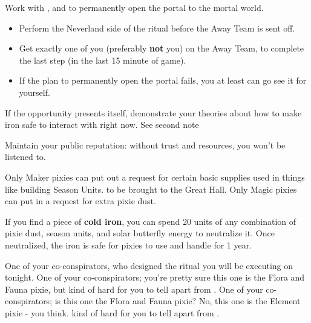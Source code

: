 \documentclass[char]{PP}
\begin{document}
\begin{itemz}
	\item Work with \cSLibrarian{}, \cFHeart{} and \cESweet{} to permanently open the portal to the mortal world.
	\begin{itemize}
		\item Perform the Neverland side of the ritual before the Away Team is sent off.
		\item Get exactly one of you (preferably \textbf{not} you) on the Away Team, to complete the last step (in the last 15 minute of game).
		\item If the plan to permanently open the portal fails, you at least can go see it for yourself.
	\end{itemize}
	\item If the opportunity presents itself, demonstrate your theories about how to make iron safe to interact with right now. See second note
	\item Maintain your public reputation: without trust and resources, you won't be listened to.
\end{itemz}

\begin{itemz}[Notes]
	\item Only Maker pixies can put out a request for certain basic supplies used in things like building Season Units. to be brought to the Great Hall. Only Magic pixies can put in a request for extra pixie dust.
	\item If you find a piece of \textbf{cold iron}, you can spend 20 units of any combination of pixie dust, season units, and solar butterfly energy to neutralize it. Once neutralized, the iron is safe for pixies to use and handle for 1 year.
\end{itemz}

\begin{contacts}
	\contact{\cSLibrarian{}} One of your co-conspirators, who designed the ritual you will be executing on tonight.
	\contact{\cFHeart{}} One of your co-conspirators; you’re pretty sure this one is the Flora and Fauna pixie, but \cFHeart{\theyare} kind of hard for you to tell apart from \cESweet{}.
	\contact{\cESweet{}} One of your co-conspirators; is this one the Flora and Fauna pixie? No, this one is the Element pixie - you think. \cESweet{\Theyare} kind of hard for you to tell apart from \cFHeart{}.
\end{contacts}
\end{document}
